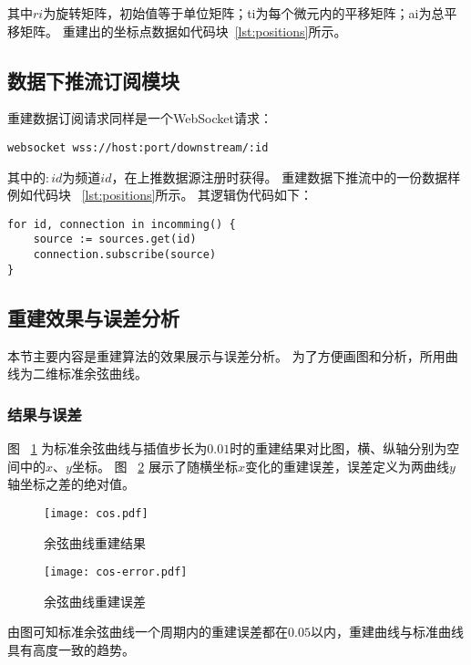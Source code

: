 其中$ri$为旋转矩阵，初始值等于单位矩阵；ti为每个微元内的平移矩阵；ai为总平移矩阵。
重建出的坐标点数据如代码块~\ref{lst:positions}所示。

\subsection{数据下推流订阅模块}

重建数据订阅请求同样是一个WebSocket请求：

\begin{lstlisting}[label={lst:subscribe},caption={重建数据订阅}]
websocket wss://host:port/downstream/:id
\end{lstlisting}

其中的$:id$为频道$id$，在上推数据源注册时获得。
重建数据下推流中的一份数据样例如代码块 ~\ref{lst:positions}所示。
其逻辑伪代码如下：

\begin{lstlisting}[caption={订阅数据源}]
for id, connection in incomming() {
    source := sources.get(id)
    connection.subscribe(source)
}
\end{lstlisting}

\subsection{重建效果与误差分析}

本节主要内容是重建算法的效果展示与误差分析。
为了方便画图和分析，所用曲线为二维标准余弦曲线。

\subsubsection{结果与误差}

图 ~\ref{fig:cos} 为标准余弦曲线与插值步长为$0.01$时的重建结果对比图，横、纵轴分别为空间中的$x$、$y$坐标。
图 ~\ref{fig:cos-error} 展示了随横坐标$x$变化的重建误差，误差定义为两曲线$y$轴坐标之差的绝对值。

\begin{figure}[H]
\centering
\texttt{[image: cos.pdf]}
\caption{余弦曲线重建结果}
\label{fig:cos}
\end{figure}

\begin{figure}[H]
\centering
\texttt{[image: cos-error.pdf]}
\caption{余弦曲线重建误差}
\label{fig:cos-error}
\end{figure}

由图可知标准余弦曲线一个周期内的重建误差都在$0.05$以内，重建曲线与标准曲线具有高度一致的趋势。

